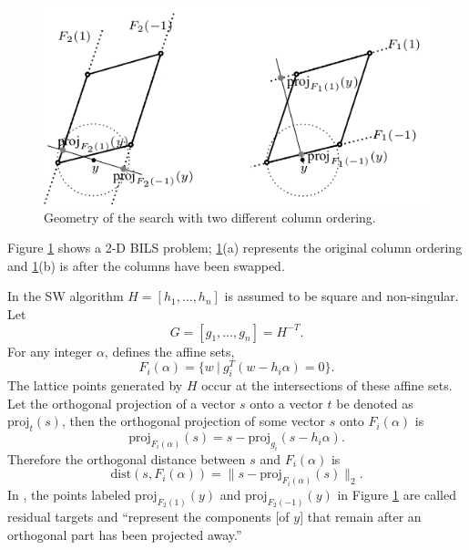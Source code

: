\documentclass[12pt,Bold,letterpaper]{mcgilletdclass}
\newcommand{\dist}{\mathrm{dist}}
\begin{document}
\ifx\du\undefined
  \newlength{\du}
\fi
\begin{figure}
\centering
\includegraphics[scale=0.7]{sumotivation.png}
\caption{Geometry of the search  with two different column ordering.}
\label{SEGeometry}
\end{figure}

Figure \ref{SEGeometry} shows a 2-D BILS problem;
\ref{SEGeometry}(a) represents the original column ordering and 
\ref{SEGeometry}(b) is after the columns have been swapped.

In the SW algorithm $H=[h_1,\ldots, h_n]$ is assumed to be square and non-singular.
Let 
$$
G =[g_1,\ldots, g_n]= H^{-T}.
$$ 
For any  integer $\alpha$,   \cite{SuW05} defines the
affine sets, $$F_i(\alpha) = \{w \ | \ g_i^T(w-h_i\alpha) = 0\}.$$
The lattice points generated by $H$ occur at the intersections of these affine sets. 
Let the orthogonal projection of a vector $s$ onto a vector $t$ be denoted as
$\mbox{proj}_t(s)$, then %
the orthogonal projection of some vector $s$ onto $F_i(\alpha)$ is 
$$\mbox{proj}_{F_i(\alpha)}(s) = s -\mbox{proj}_{g_i}(s-h_i\alpha).$$ 
Therefore the orthogonal distance between $s$ and
$F_i(\alpha)$ is $$\dist(s,F_i(\alpha)) =  \| s - \mbox{proj}_{F_i(\alpha)}(s) \|_2.$$
In \cite{SuW05}, the points labeled $\mbox{proj}_{F_2(1)}(y)$ and
$\mbox{proj}_{F_2(-1)}(y)$ in Figure \ref{SEGeometry}
are called residual targets  and ``represent the
components [of $y$] that remain after an orthogonal part has been projected
away.''  
\end{document}
